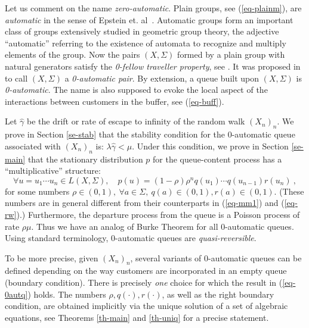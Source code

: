 \documentclass[11pt,a4paper]{article}
\theoremstyle{remark}
\def\eref#1{(\ref{#1})}
\begin{document}
\medskip

Let us comment on the name
{\em zero-automatic}. Plain groups, see \eref{eq-plainm}, are
{\em automatic} in the sense of Epstein et. al~\cite{ECHLPT}. Automatic
groups form an important class of groups extensively studied in
geometric group theory, the adjective ``automatic'' referring to the
existence of automata to recognize and multiply elements of the
group. Now the pairs $(X,\Sigma)$ formed by a plain group with natural
generators satisfy the {\em 0-fellow traveller property}, see
\cite{ECHLPT}. It was proposed in \cite{mair04} to call 
$(X,\Sigma)$ a {\em 0-automatic pair}. By extension, a queue built
upon $(X,\Sigma)$ is {\em 0-automatic}. The name is also supposed
to evoke the local aspect of the interactions between customers in the
buffer, see \eref{eq-buff}. 

\medskip

Let $\widehat{\gamma}$ be the drift or rate of escape to infinity of the random
walk $(X_n)_n$. We prove in Section \ref{se-stab} that the stability
condition for the 0-automatic
queue associated with $(X_n)_n$ is: $\lambda\widehat{\gamma} < \mu$. Under this
condition, we prove in Section \ref{se-main} that the stationary
distribution $p$ for the queue-content process has a
``multiplicative'' structure:
\begin{equation}\label{eq-0autq}
\forall u=u_1\cdots u_n \in L(X,\Sigma), \quad p(u) = (1-\rho)\rho^n
q(u_1)\cdots q(u_{n-1}) r(u_n) \:,
\end{equation}
for some numbers $\rho\in (0,1), \ \forall a\in \Sigma, \ q(a)\in
(0,1),r(a)\in (0,1)$. (These numbers are in general different from
their counterparts in \eref{eq-mm1} and \eref{eq-rw}.)
Furthermore, the departure process from the
queue is a Poisson process of rate $\rho\mu$. Thus we have an analog
of Burke Theorem for all 0-automatic queues. Using standard
terminology, 0-automatic queues are {\em quasi-reversible}.

To be more precise, given $(X_n)_n$, several variants of 0-automatic
queues can be defined depending on the way customers are incorporated
in an empty queue (boundary condition). There is
precisely {\em one} choice for
which the result in \eref{eq-0autq} holds. The numbers $\rho,
q(\cdot ), r(\cdot )$, as well as the right boundary condition,
are obtained implicitly via the unique
solution of a set of algebraic equations, see Theorems
\ref{th-main} and \ref{th-uniq} for a precise statement.

\medskip
\end{document}
